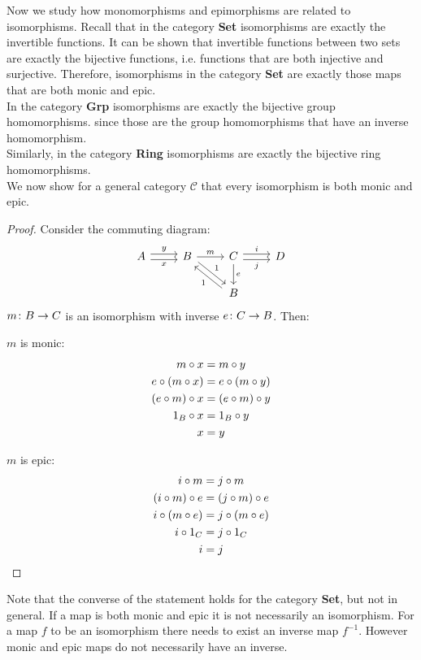 Now we study how monomorphisms and epimorphisms are related to isomorphisms.
Recall that in the category \textbf{Set} isomorphisms are exactly the invertible functions.
It can be shown that invertible functions between two sets are
exactly the bijective functions, i.e. functions that are both injective and surjective.
Therefore, isomorphisms in the category \textbf{Set} are exactly those maps that are both monic and epic.\\
In the category \textbf{Grp} isomorphisms are exactly the bijective group homomorphisms.
since those are the group homomorphisms that have an inverse homomorphism.\\
Similarly, in the category \textbf{Ring} isomorphisms are exactly the bijective ring homomorphisms.\\
We now show for a general category $\mathscr{C}$ that every isomorphism is both monic and epic.
\begin{proof}
  Consider the commuting diagram:
  \[
    \begin{tikzcd}
      A \arrow[r,shift left, "y"] \arrow[r,shift right,swap,"x"] &
      B \arrow[dr, shift left, "1"]  \arrow{r}{m}  &
      C \arrow{d}{e} \arrow[r,shift left, "i"] \arrow[r,shift right,swap,"j"] & D\\
      &  & B \arrow[ul, shift left, "1"]&
    \end{tikzcd}
  \]
  $m \from B \to C$ is an isomorphism with inverse $e \from C \to B$.
  Then:\\
  \begin{minipage}{.5\linewidth}
    \vspace{4mm}
    \centering $m$ is monic:
    \[
      \begin{aligned}
        m \mathbin{\circ} x &= m \mathbin{\circ} y\\
        e \mathbin{\circ} (m \mathbin{\circ} x) &= e \mathbin{\circ} (m \mathbin{\circ} y)\\
        (e \mathbin{\circ} m) \mathbin{\circ} x &= (e \mathbin{\circ} m) \mathbin{\circ} y\\
        1_B \mathbin{\circ} x &= 1_B \mathbin{\circ} y\\
        x &= y
      \end{aligned}
    \]
  \end{minipage}%
  \begin{minipage}{.5\linewidth}
    \vspace{4mm}
    \centering $m$ is epic:
    \[
      \begin{aligned}
        i \mathbin{\circ} m &= j \mathbin{\circ} m \\
        (i \mathbin{\circ} m) \mathbin{\circ} e &= (j \mathbin{\circ} m) \mathbin{\circ} e\\
        i \mathbin{\circ} (m \mathbin{\circ} e) &= j \mathbin{\circ} (m \mathbin{\circ} e)\\
        i \mathbin{\circ} 1_C &= j \mathbin{\circ} 1_C\\
        i &= j
      \end{aligned}
    \]
  \end{minipage}%
\end{proof}
Note that the converse of the statement holds for the category \textbf{Set}, but not in general.
If a map is both monic and epic it is not necessarily an isomorphism.
For a map $f$ to be an isomorphism there needs to exist an inverse map $f^{-1}$.
However monic and epic maps do not necessarily have an inverse.\\

